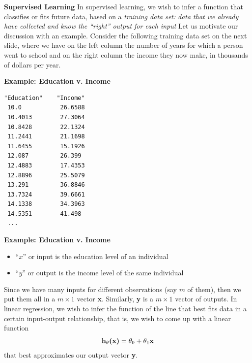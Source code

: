 \documentclass[xcolor=dvipsnames]{beamer}
\begin{document}
\begin{frame}
{\bf Supervised Learning}
In supervised learning, we wish to infer a function that classifies or fits future data, based on a \emph{training data set:} \vfill\pause
\emph{data that we already have collected and know the ``right'' output for each input}
\vfill\pause 
Let us motivate our discussion with an example. Consider the following training data set on the next slide, where we have on the left column the number of years for which a person went to school and on the right column the income they now make, in thousands of dollars per year.\\
\end{frame}

\begin{frame}[fragile]
{\bf Example: Education v. Income}
\begin{verbatim}
"Education"    "Income"
 10.0           26.6588   
 10.4013        27.3064   
 10.8428        22.1324   
 11.2441        21.1698   
 11.6455        15.1926   
 12.087         26.399    
 12.4883        17.4353   
 12.8896        25.5079   
 13.291         36.8846   
 13.7324        39.6661   
 14.1338        34.3963   
 14.5351        41.498    
 ...                
\end{verbatim}  
\end{frame}

\begin{frame}
{\bf Example: Education v. Income}
\begin{itemize}
\item ``$x$'' or input is the education level of an individual
\item ``$y$'' or output is the income level of the same individual
\end{itemize}
\pause
Since we have many inputs for different observations (say $m$ of them), then we put them all in a $m \times 1$ vector {\bf x}.\vfill \pause 
Similarly, {\bf y} is a $m \times 1$ vector of outputs. \vfill\pause
In linear regression, we wish to infer the function of the line that best fits data in a certain input-output relationship, that is, we wish to come up with a linear function \pause
\[
\textnormal{{\bf h$_{\theta}$(x)}} =  \theta_0 +
\theta_1 \textnormal{{\bf x}}
\]
\pause that best approximates our output vector {\bf y}.
\end{frame}
\end{document}
